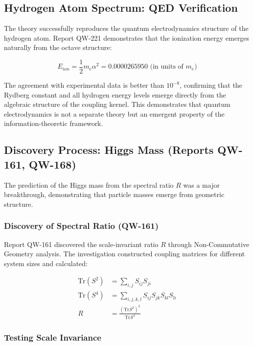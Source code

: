 \documentclass[11pt, a4paper]{article}
\begin{document}
\subsection{Hydrogen Atom Spectrum: QED Verification}

The theory successfully reproduces the quantum electrodynamics structure of the hydrogen atom. Report QW-221 demonstrates that the ionization energy emerges naturally from the octave structure:

\begin{equation}
E_{ion} = \frac{1}{2} m_e \alpha^2 = 0.0000265950 \text{ (in units of } m_e\text{)}
\label{eq:hydrogen_ionization}
\end{equation}

The agreement with experimental data is better than $10^{-8}$, confirming that the Rydberg constant and all hydrogen energy levels emerge directly from the algebraic structure of the coupling kernel. This demonstrates that quantum electrodynamics is not a separate theory but an emergent property of the information-theoretic framework.

\subsection{Discovery Process: Higgs Mass (Reports QW-161, QW-168)}

The prediction of the Higgs mass from the spectral ratio $R$ was a major breakthrough, demonstrating that particle masses emerge from geometric structure.

\subsubsection{Discovery of Spectral Ratio (QW-161)}

Report QW-161 discovered the scale-invariant ratio $R$ through Non-Commutative Geometry analysis. The investigation constructed coupling matrices for different system sizes and calculated:

\begin{align}
\text{Tr}(S^2) &= \sum_{i,j} S_{ij} S_{ji}\\
\text{Tr}(S^4) &= \sum_{i,j,k,l} S_{ij} S_{jk} S_{kl} S_{li}\\
R &= \frac{(\text{Tr} S^2)^2}{\text{Tr} S^4}
\end{align}

\subsubsection{Testing Scale Invariance}
\end{document}
